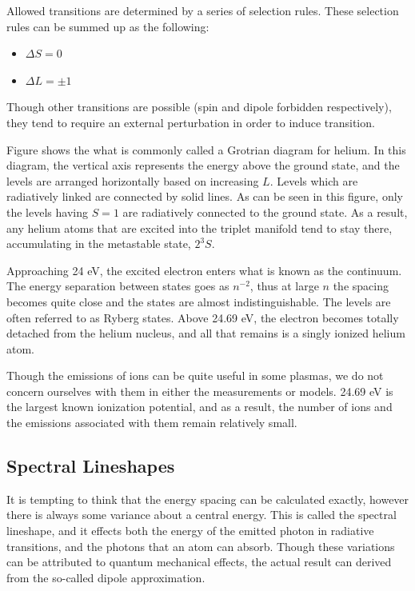 Allowed transitions are determined by a series of selection rules. These
selection rules can be summed up as the following:
\begin{itemize}
    \item $\Delta S = 0$
    \item $\Delta L = \pm1$
\end{itemize}
Though other transitions are possible (spin and dipole forbidden respectively),
they tend to require an external perturbation in order to induce transition.

Figure shows the what is commonly called a Grotrian diagram for helium.
In this diagram, the vertical axis represents the energy above the
ground state, and the levels are arranged horizontally based on
increasing $L$. Levels which are radiatively linked are connected by
solid lines. As can be seen in this figure, only the levels having $S=1$
are radiatively connected to the ground state. As a result, any helium
atoms that are excited into the triplet manifold tend to stay there,
accumulating in the metastable state, $2^3S$.

Approaching 24 eV, the excited electron enters what is known as the continuum.
The energy separation between states goes as $n^{-2}$, thus at large $n$ the
spacing becomes quite close and the states are almost indistinguishable. The
levels are often referred to as Ryberg states. Above 24.69 eV, the electron
becomes totally detached from the helium nucleus, and all that remains is
a singly ionized helium atom.

Though the emissions of ions can be quite useful in some plasmas, we do not
concern ourselves with them in either the measurements or models. 24.69 eV is
the largest known ionization potential, and as a result, the number of ions and
the emissions associated with them remain relatively small.

\subsection{Spectral Lineshapes}
It is tempting to think that the energy spacing can be calculated exactly,
however there is always some variance about a central energy. This is called the
spectral lineshape, and it effects both the energy of the emitted photon in
radiative transitions, and the photons that an atom can absorb. Though these
variations can be attributed to quantum mechanical effects, the actual result
can derived from the so-called dipole approximation.

